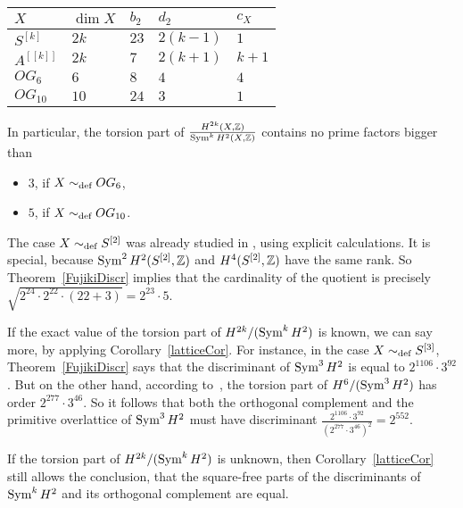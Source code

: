 \begin{center}
\begin{tabular}{ p{2cm} p{2cm} p{2cm} p{2cm} p{2cm} }
$X$ 		& $\dim X$	& $b_2$ & $d_2$	& $c_X$ \\ \hline 
$S^{[k]}$ 	& $2k$ 		& $23$ 	& $ 2(k-1)$		& $1$	\\
$A^{[[k]]}$	& $2k$ 		& $7$	& $ 2(k+1)$		& $k+1$ \\
$OG_6$		& $6$		& $8$	& $4$			& $4$ 	\\
$OG_{10}$	& $10$		& $24$	& $3$			& $1$ 	
\end{tabular}
\end{center}
In particular, the torsion part of $\frac{H^{2k}(X,\mathbb{Z})}{\operatorname{Sym}^kH^2(X,\mathbb{Z})}$ contains no prime factors bigger than
\begin{itemize}
\item $3$, if $X\sim_{\text{def}} OG_6$,
\item $5$, if $X\sim_{\text{def}} OG_{10}$.
\end{itemize} 
\begin{remark}
The case $X\sim_{\text{def}} S^{[2]}$ was already studied in \cite[Prop.~6.6]{BNS}, using explicit calculations. It is special, because $\operatorname{Sym}^2H^2(S^{[2]},\mathbb{Z})$ and $H^4(S^{[2]},\mathbb{Z})$ have the same rank. So Theorem~\ref{FujikiDiscr} implies that the cardinality of the quotient is precisely $\sqrt{2^{24}\cdot2^{22}\cdot(22+3)} = 2^{23}\cdot5$.
\end{remark}
\begin{remark}
If the exact value of the torsion part of $H^{2k}/(\operatorname{Sym}^kH^2)$ is known, we can say more, by applying Corollary~\ref{latticeCor}. For instance,
in the case $X\sim_{\text{def}} S^{[3]}$, Theorem~\ref{FujikiDiscr} says that the discriminant of $\operatorname{Sym}^3H^2$ is equal to $2^{1106}\cdot 3^{92}$. But on the other hand, according to~\cite[Prop.~2.4]{Kapfer}, the torsion part of $H^6/(\operatorname{Sym}^3H^2)$ has order $2^{277}\cdot 3^{46}$. So it follows that both the orthogonal complement and the primitive overlattice of $\operatorname{Sym}^3H^2$ must have discriminant $\frac{2^{1106}\cdot 3^{92}}{(2^{277}\cdot 3^{46})^2}=2^{552}$.

If the torsion part of $H^{2k}/(\operatorname{Sym}^kH^2)$ is unknown, then Corollary~\ref{latticeCor} still allows the conclusion, that the square-free parts of the discriminants of $\operatorname{Sym}^kH^2$ and its orthogonal complement are equal.
\end{remark}
\renewcommand{\G}{\mathfrak{G}}
